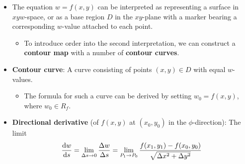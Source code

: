 \documentclass[../main.tex]{subfiles}
\begin{document}
\begin{itemize}
    \item The equation $w=f(x,y)$ can be interpreted as representing a surface in $xyw$-space, or as a base region $D$ in the $xy$-plane with a marker bearing a corresponding $w$-value attached to each point.
    \begin{itemize}
        \item To introduce order into the second interpretation, we can construct a \textbf{contour map} with a number of \textbf{contour curves}.
    \end{itemize}
    \item \textbf{Contour curve}: A curve consisting of points $(x,y)\in D$ with equal $w$-values.
    \begin{itemize}
        \item The formula for such a curve can be derived by setting $w_0=f(x,y)$, where $w_0\in R_f$.
    \end{itemize}
    \item \textbf{Directional derivative} (of $f(x,y)$ at $(x_0,y_0)$ in the $\phi$-direction): The limit
    \begin{equation*}
        \dv{w}{s} = \lim_{\Delta s\to 0}\frac{\Delta w}{\Delta s} = \lim_{P_1\to P_0}\frac{f(x_1,y_1)-f(x_0,y_0)}{\sqrt{\Delta x^2+\Delta y^2}}
    \end{equation*}
    \begin{figure}[h!]
        \centering
\end{figure}
\end{itemize}
\end{document}
